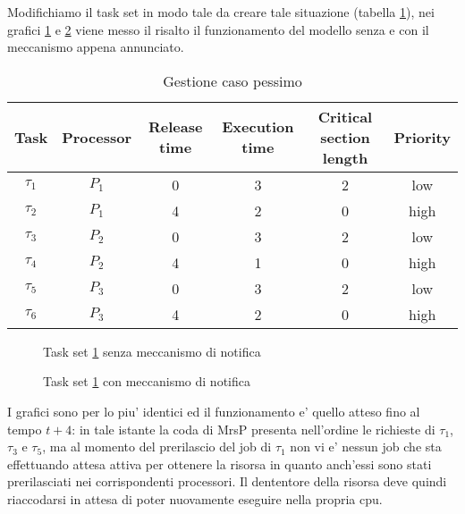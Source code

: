 \documentclass[a4paper,11pt]{article}
\begin{document}
\noindent Modifichiamo il task set in modo tale da creare tale situazione (tabella \ref{table:secondo taskset}), nei grafici \ref{fourth} e \ref{fiveth} viene messo il risalto il funzionamento del modello senza e con il meccanismo appena annunciato.\\

\begin{table}
	\centering
	\begin{tabular}{cccccc}
	\hline\hline
    Task     & Processor & Release time & Execution time & Critical section length & Priority \\ \hline
    $\tau_1$ & $P_1$  & 0            & 3              & 2                       & low      \\
    $\tau_2$ & $P_1$  & 4            & 2              & 0                       & high     \\
    $\tau_3$ & $P_2$  & 0            & 3              & 2                       & low      \\
    $\tau_4$ & $P_2$  & 4            & 1              & 0                       & high     \\
    $\tau_5$ & $P_3$  & 0            & 3              & 2                       & low      \\
    $\tau_6$ & $P_3$  & 4            & 2              & 0                       & high     \\
    \hline
    \end{tabular}
	\caption{Gestione caso pessimo}
	\label{table:secondo taskset} 
\end{table}

\begin{figure}
	\centering
	\ModelloConcettualeFour
	\caption{Task set \ref{table:secondo taskset} senza meccanismo di notifica}
	\label{fourth}
\end{figure}

\begin{figure}
	\centering
	\ModelloConcettualeFiveth
	\caption{Task set \ref{table:secondo taskset} con meccanismo di notifica}
	\label{fiveth}
\end{figure}

\noindent I grafici sono per lo piu' identici ed il funzionamento e' quello atteso fino al tempo $t + 4$: in tale istante la coda di MrsP presenta nell'ordine le richieste di $\tau_1$, $\tau_3$ e $\tau_5$, ma al momento del prerilascio del job di $\tau_1$ non vi e' nessun job che sta effettuando attesa attiva per ottenere la risorsa in quanto anch'essi sono stati prerilasciati nei corrispondenti processori. Il dententore della risorsa deve quindi riaccodarsi in attesa di poter nuovamente eseguire nella propria cpu.
\end{document}
